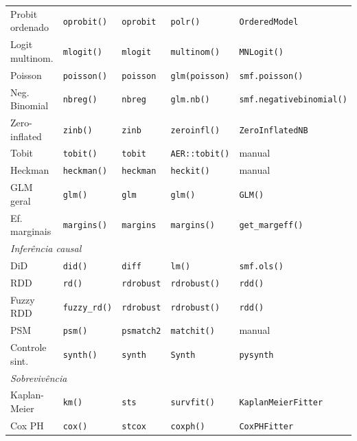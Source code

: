 {\begin{longtable}{lllll}
Probit ordenado & \texttt{oprobit()}    & \texttt{oprobit}      & \texttt{polr()}        & \texttt{OrderedModel} \\
Logit multinom. & \texttt{mlogit()}     & \texttt{mlogit}       & \texttt{multinom()}    & \texttt{MNLogit()} \\
Poisson         & \texttt{poisson()}    & \texttt{poisson}      & \texttt{glm(poisson)}  & \texttt{smf.poisson()} \\
Neg. Binomial   & \texttt{nbreg()}      & \texttt{nbreg}        & \texttt{glm.nb()}      & \texttt{smf.negativebinomial()} \\
Zero-inflated   & \texttt{zinb()}       & \texttt{zinb}         & \texttt{zeroinfl()}    & \texttt{ZeroInflatedNB} \\
Tobit           & \texttt{tobit()}      & \texttt{tobit}        & \texttt{AER::tobit()}  & manual \\
Heckman         & \texttt{heckman()}    & \texttt{heckman}      & \texttt{heckit()}      & manual \\
GLM geral       & \texttt{glm()}        & \texttt{glm}          & \texttt{glm()}         & \texttt{GLM()} \\
Ef. marginais   & \texttt{margins()}    & \texttt{margins}      & \texttt{margins()}     & \texttt{get\_margeff()} \\
\midrule
\multicolumn{5}{l}{\textit{Inferência causal}} \\
DiD             & \texttt{did()}        & \texttt{diff}         & \texttt{lm()}          & \texttt{smf.ols()} \\
RDD             & \texttt{rd()}         & \texttt{rdrobust}     & \texttt{rdrobust()}    & \texttt{rdd()} \\
Fuzzy RDD       & \texttt{fuzzy\_rd()}   & \texttt{rdrobust}     & \texttt{rdrobust()}    & \texttt{rdd()} \\
PSM             & \texttt{psm()}        & \texttt{psmatch2}     & \texttt{matchit()}     & manual \\
Controle sint.  & \texttt{synth()}      & \texttt{synth}        & \texttt{Synth}         & \texttt{pysynth} \\
\midrule
\multicolumn{5}{l}{\textit{Sobrevivência}} \\
Kaplan-Meier    & \texttt{km()}         & \texttt{sts}          & \texttt{survfit()}     & \texttt{KaplanMeierFitter} \\
Cox PH          & \texttt{cox()}        & \texttt{stcox}        & \texttt{coxph()}       & \texttt{CoxPHFitter} \\

\end{longtable}}
